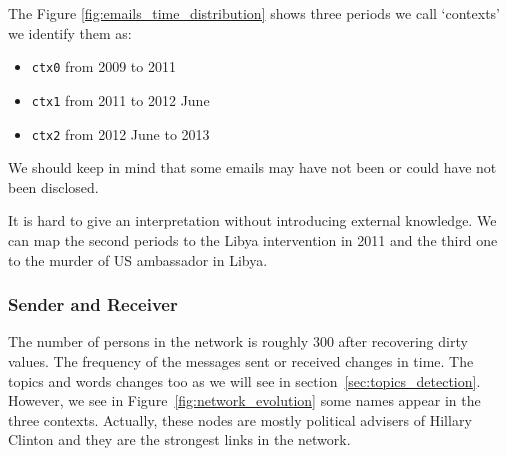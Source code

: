 \documentclass[11pt]{article}
\begin{document}
The Figure \ref{fig:emails_time_distribution} shows three periods we call `contexts' we identify them as:

\begin{itemize}
    \item \texttt{ctx0} from 2009 to 2011
    \item \texttt{ctx1} from 2011 to 2012 June
    \item \texttt{ctx2} from 2012 June to 2013
\end{itemize}

We should keep in mind that some emails may have not been or could have not been disclosed.

It is hard to give an interpretation without introducing external knowledge. We can map the second periods to the Libya intervention in 2011 and the third one to the murder of US ambassador in Libya.

\subsubsection{Sender and Receiver}
\label{sec:sender_receiver}

The number of persons in the network is roughly $300$ after recovering dirty values. The frequency of the messages sent or received changes in time. The topics and words changes too as we will see in section~\ref{sec:topics_detection}. However, we see in Figure~\ref{fig:network_evolution} some names appear in the three contexts. Actually, these nodes are mostly political advisers of Hillary Clinton and they are the strongest links in the network.
\end{document}
